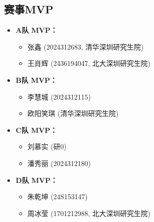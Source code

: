 \documentclass{ctexart}
\begin{document}
\subsection*{赛事MVP}
\begin{itemize}
    \item \textbf{A队 MVP：} 
        \begin{itemize}
            \item 张鑫 (2024312683, 清华深圳研究生院)
            \item 王肖辉 (2436194047, 北大深圳研究生院)
        \end{itemize}
    \item \textbf{B队 MVP：} 
        \begin{itemize}
            \item 李慧城 (2024312115)
            \item 欧阳笑琪 (清华深圳研究生院)
        \end{itemize}
    \item \textbf{C队 MVP：} 
        \begin{itemize}
            \item 刘慕实 (研0)
            \item 潘秀丽 (2024312180)
        \end{itemize}
    \item \textbf{D队 MVP：} 
        \begin{itemize}
            \item 朱乾坤 (24S153147)
            \item 周冰莹 (1701212988, 北大深圳研究生院)
        \end{itemize}
\end{itemize}

\newpage
\end{document}
